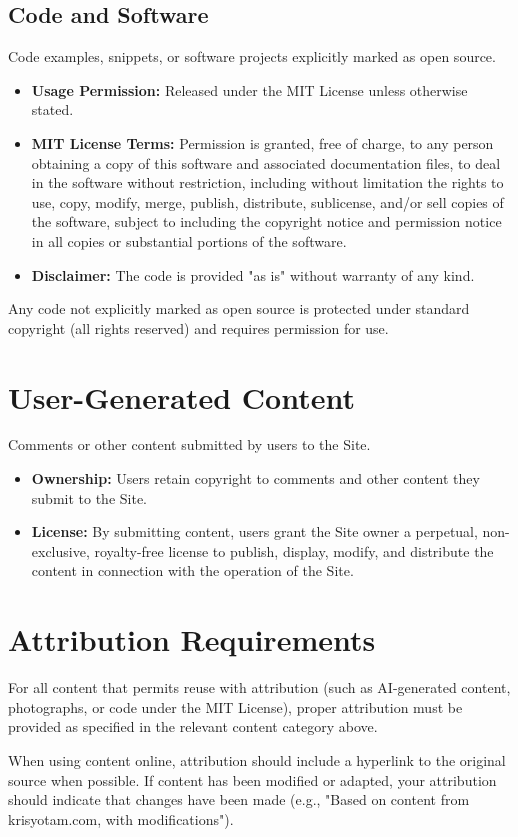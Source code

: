 \documentclass[11pt]{article}
\begin{document}
\subsection{Code and Software}
Code examples, snippets, or software projects explicitly marked as open source.
\begin{itemize}
  \item \textbf{Usage Permission:} Released under the MIT License unless otherwise stated.
  \item \textbf{MIT License Terms:} Permission is granted, free of charge, to any person obtaining a copy of this software and associated documentation files, to deal in the software without restriction, including without limitation the rights to use, copy, modify, merge, publish, distribute, sublicense, and/or sell copies of the software, subject to including the copyright notice and permission notice in all copies or substantial portions of the software.
  \item \textbf{Disclaimer:} The code is provided "as is" without warranty of any kind.
\end{itemize}
Any code not explicitly marked as open source is protected under standard copyright (all rights reserved) and requires permission for use.

\section{User-Generated Content}
Comments or other content submitted by users to the Site.
\begin{itemize}
  \item \textbf{Ownership:} Users retain copyright to comments and other content they submit to the Site.
  \item \textbf{License:} By submitting content, users grant the Site owner a perpetual, non-exclusive, royalty-free license to publish, display, modify, and distribute the content in connection with the operation of the Site.
\end{itemize}

\section{Attribution Requirements}
For all content that permits reuse with attribution (such as AI-generated content, photographs, or code under the MIT License), proper attribution must be provided as specified in the relevant content category above.

When using content online, attribution should include a hyperlink to the original source when possible. If content has been modified or adapted, your attribution should indicate that changes have been made (e.g., "Based on content from krisyotam.com, with modifications").
\end{document}
